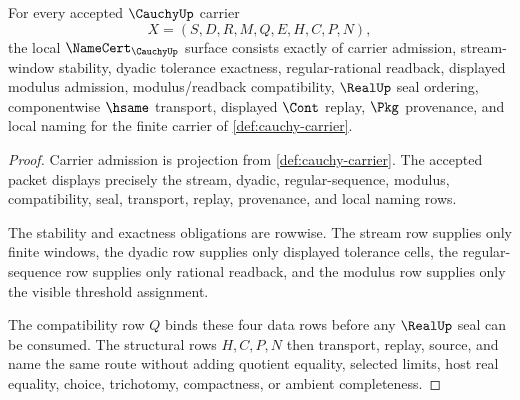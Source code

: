 \begin{theorem}
\label{thm:cauchy-namecert-obligations}
For every accepted $\CauchyUp$ carrier
$$
X=(S,D,R,M,Q,E,H,C,P,N),
$$
the local $\NameCert_{\CauchyUp}$ surface consists exactly of carrier admission, stream-window stability, dyadic tolerance exactness, regular-rational readback, displayed modulus admission, modulus/readback compatibility, $\RealUp$ seal ordering, componentwise $\hsame$ transport, displayed $\Cont$ replay, $\Pkg$ provenance, and local naming for the finite carrier of \autoref{def:cauchy-carrier}.
\end{theorem}
\begin{proof}
Carrier admission is projection from \autoref{def:cauchy-carrier}. The accepted packet displays precisely the stream, dyadic, regular-sequence, modulus, compatibility, seal, transport, replay, provenance, and local naming rows.

The stability and exactness obligations are rowwise. The stream row supplies only finite windows, the dyadic row supplies only displayed tolerance cells, the regular-sequence row supplies only rational readback, and the modulus row supplies only the visible threshold assignment.

The compatibility row $Q$ binds these four data rows before any $\RealUp$ seal can be consumed. The structural rows $H,C,P,N$ then transport, replay, source, and name the same route without adding quotient equality, selected limits, host real equality, choice, trichotomy, compactness, or ambient completeness.
\end{proof}


